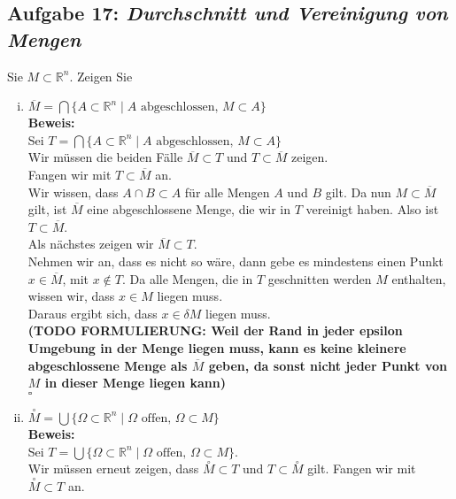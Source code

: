 \documentclass[11pt,a4paper,ngerman]{article}
\begin{document}
\subsection*{Aufgabe 17: \mdseries\itshape Durchschnitt und Vereinigung von Mengen}
	Sie $M \subset \mathbb{R}^n$. Zeigen Sie
	\begin{enumerate}[(i)]
		\item $\overline{M} = \bigcap \{ A \subset \mathbb{R}^n \; | \; A \text{ abgeschlossen, } M \subset A \}$\\
		\textbf{Beweis:}\\
            Sei $T = \bigcap \{ A \subset \mathbb{R}^n \; | \; A \text{ abgeschlossen, } M \subset A \}$\\
		    Wir müssen die beiden Fälle $\overline{M} \subset T$ und $T \subset \overline{M}$ zeigen.\\

            Fangen wir mit $T \subset \overline{M}$ an.\\
            Wir wissen, dass $A \cap B \subset A$ für alle Mengen $A$ und $B$ gilt. 
            Da nun $M \subset \overline{M}$ gilt, ist $\overline{M}$ eine abgeschlossene Menge, die
            wir in $T$ vereinigt haben. Also ist $T \subset \overline{M}$.\\

            Als nächstes zeigen wir $\overline{M} \subset T$.\\
            Nehmen wir an, dass es nicht so wäre, dann gebe es mindestens einen Punkt $x \in \overline{M}$,
            mit $x \not \in T$. Da alle Mengen, die in $T$ geschnitten werden $M$ enthalten, wissen wir,
            dass $x\in M$ liegen muss.\\
            Daraus ergibt sich, dass $x \in \delta M$ liegen muss.\\

            \textbf{
            (TODO FORMULIERUNG: Weil der Rand in jeder epsilon Umgebung in der Menge liegen muss,
            kann es keine kleinere abgeschlossene Menge als $\overline{M}$ geben, da sonst
            nicht jeder Punkt von $M$ in dieser Menge liegen kann)
            }\\
            \mbox{} \hfill $\square$

		\item $\overset{\circ}{M} = \bigcup \{ \Omega \subset \mathbb{R}^n \; | \; \Omega \text{ offen, } \Omega \subset M \}$\\
		\textbf{Beweis:}\\
		    Sei $T = \bigcup \{ \Omega \subset \mathbb{R}^n \; | 
                \; \Omega \text{ offen, } \Omega \subset M \}$.\\
            Wir müssen erneut zeigen, dass $\overset{\circ}{M} \subset T$ und 
            $T \subset \overset{\circ}{M}$ gilt. Fangen wir mit
            $\overset{\circ}{M} \subset T$ an.\\
            

\end{enumerate}
\end{document}

